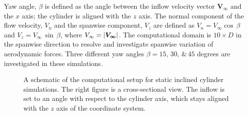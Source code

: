 Yaw angle, $\beta$ is defined as the angle between the inflow velocity vector
$\boldsymbol{V_\infty}$ and the $x$ axis; the cylinder is aligned with the $z$
axis. The normal component of the flow velocity, $V_n$ and the spanwise
component, $V_z$ are defined as $V_n=V_\infty \cos\,\beta$ and $V_z = V_\infty
\,\sin\,\beta$, where $V_\infty=\left| \boldsymbol{V_\infty} \right|$. The computational
domain is $10\times D$ in the spanwise direction to resolve and investigate
spanwise variation of aerodynamic forces. Three different yaw angles
$\beta=15,\,30,\,\&\,45$ degrees are investigated in these simulations.
%
\begin{figure}[htb!]
  \caption{A schematic of the computational setup for static inclined cylinder
    simulations. The right figure is a cross-sectional view.  The inflow is set
    to an angle with respect to the cylinder axis, which stays aligned with the $z$
    axis of the coordinate system.}
  \label{fig:yawedModel}
\end{figure}

